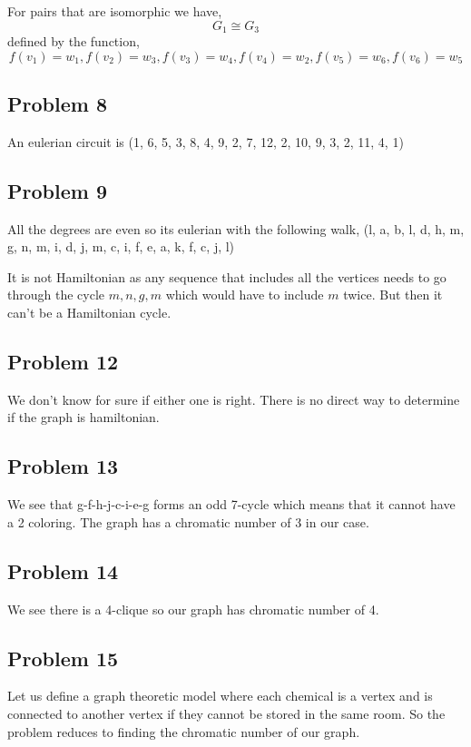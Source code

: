 \documentclass[a4paper]{report}
\begin{document}
For pairs that are isomorphic we have, 
$$G_1 \cong G_3$$
defined by the function, 
$$ f(v_1)  = w_1, f(v_2) = w_3, f(v_3) = w_4, f(v_4) = w_2, f(v_5) = w_6, f(v_6) = w_5$$
\subsection*{Problem 8}

An eulerian circuit is (1, 6, 5, 3, 8, 4, 9, 2, 7, 12, 2, 10, 9, 3, 2, 11, 4, 1)

\subsection*{Problem 9}
All the degrees are even so its eulerian with the following walk, 
(l, a, b, l, d, h, m, g, n, m, i, d, j, m, c, i, f, e, a, k, f, c, j, l)


It is not Hamiltonian as any sequence that includes all the vertices needs to go through the cycle $m, n , g, m$ which would have to include  $m$ twice. But then it can't be a Hamiltonian cycle.
\subsection*{Problem 12}
We don't know for sure if either one is right. There is no direct way to determine if the graph is hamiltonian.
\subsection*{Problem 13}
We see that g-f-h-j-c-i-e-g forms an odd 7-cycle which means that it cannot have a 2 coloring. The graph has a chromatic number of 3 in our case.
\subsection*{Problem 14}
We see there is a 4-clique so our graph has chromatic number of 4.
\subsection*{Problem 15}

Let us define a graph theoretic model where each chemical is a vertex and is connected to another vertex if they cannot be stored in the same room. So the problem reduces to finding the chromatic number of our graph.
\end{document}
